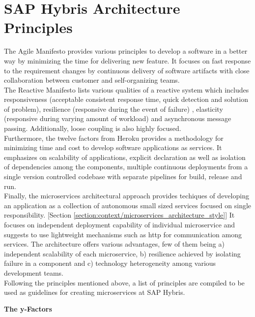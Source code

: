 \section{SAP Hybris Architecture Principles}\label{section:hybris_architecture/YaaS_architecture_principles}
The Agile Manifesto \cite{Beck:2011aa} provides various principles to develop a software in a better way by minimizing the time for delivering new feature. It focuses on fast response to the requirement changes by continuous delivery of software artifacts with close collaboration between customer and self-organizing teams.\\
The Reactive Manifesto \cite{Boner:2014aa} lists various qualities of a reactive system which includes responsiveness (acceptable consistent response time, quick detection and solution of problem), resilience (responsive during the event of failure) , elasticity (responsive during varying amount of workload) and asynchronous message passing. Additionally, loose coupling is also highly focused.\\
Furthermore, the twelve factors from Heroku \cite{Wiggins:2012aa} provides a methodology for minimizing time and cost to develop software applications as services. It emphasizes on scalability of applications, explicit declaration as well as isolation of dependencies among the components, multiple continuous deployments from a single version controlled codebase with separate pipelines for build, release and run.\\
Finally, the microservices architectural approach provides techiques of developing an application as a collection of autonomous small sized services focused on single responsibility. [Section \ref{section:context/microservices_architecture_style}] It focuses on independent deployment capability of individual microservice and suggests to use lightweight mechanisms such as http for communication among services. The architecture offers various advantages, few of them being a) independent scalability of each microservice, b) resilience achieved by isolating failure in a component and c) technology heterogeneity among various development teams. \cite{Newman:2015aa}
\\
Following the principles mentioned above, a list of principles are compiled to be used as guidelines for creating microservices at SAP Hybris. \cite{Stubbe:2015aa}
\\
\begin{shaded}\textbf{The y-Factors}\end{shaded}
\\
